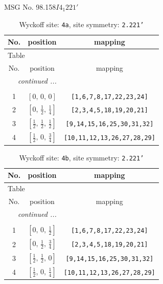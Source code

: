 \documentclass[fleqn,8pt]{jsarticle}
\begin{document}
\setcounter{MaxMatrixCols}{32}

\renewcommand{\tablename}{Table~}
\renewcommand{\figurename}{Figure~}
\begin{center}
\LARGE
MSG No. 98.158\quad$I4_{1}221'$
\end{center}
\renewcommand{\arraystretch}{1.2}
\begin{longtable}{ccc}
\caption{Wyckoff site: {\tt 4a}, site symmetry: {\tt 2.221'}}
 \\
 \hline \hline
No. & position & mapping \\ \hline \endfirsthead

\multicolumn{2}{l}{\tablename\ \thetable{}} \\
 \hline \hline
No. & position & mapping \\ \hline \endhead

 \hline \hline
\multicolumn{2}{r}{\footnotesize\it continued ...} \\ \endfoot

 \hline \hline
\multicolumn{2}{r}{} \\ \endlastfoot

1 & $\left[ 0,\, 0,\, 0 \right]$ & {\tt [1,6,7,8,17,22,23,24]} \\ \hline
2 & $\left[ 0,\, \frac{1}{2},\, \frac{1}{4} \right]$ & {\tt [2,3,4,5,18,19,20,21]} \\ \hline
3 & $\left[ \frac{1}{2},\, \frac{1}{2},\, \frac{1}{2} \right]$ & {\tt [9,14,15,16,25,30,31,32]} \\ \hline
4 & $\left[ \frac{1}{2},\, 0,\, \frac{3}{4} \right]$ & {\tt [10,11,12,13,26,27,28,29]} \\
\end{longtable}
\renewcommand{\arraystretch}{1.2}
\begin{longtable}{ccc}
\caption{Wyckoff site: {\tt 4b}, site symmetry: {\tt 2.221'}}
 \\
 \hline \hline
No. & position & mapping \\ \hline \endfirsthead

\multicolumn{2}{l}{\tablename\ \thetable{}} \\
 \hline \hline
No. & position & mapping \\ \hline \endhead

 \hline \hline
\multicolumn{2}{r}{\footnotesize\it continued ...} \\ \endfoot

 \hline \hline
\multicolumn{2}{r}{} \\ \endlastfoot

1 & $\left[ 0,\, 0,\, \frac{1}{2} \right]$ & {\tt [1,6,7,8,17,22,23,24]} \\ \hline
2 & $\left[ 0,\, \frac{1}{2},\, \frac{3}{4} \right]$ & {\tt [2,3,4,5,18,19,20,21]} \\ \hline
3 & $\left[ \frac{1}{2},\, \frac{1}{2},\, 0 \right]$ & {\tt [9,14,15,16,25,30,31,32]} \\ \hline
4 & $\left[ \frac{1}{2},\, 0,\, \frac{1}{4} \right]$ & {\tt [10,11,12,13,26,27,28,29]} \\
\end{longtable}
\end{document}

